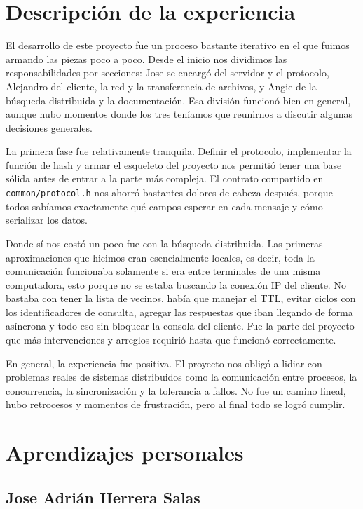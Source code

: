 \documentclass[12pt]{article}
\begin{document}
\newpage
\section{Descripción de la experiencia}

El desarrollo de este proyecto fue un proceso bastante iterativo en el que
fuimos armando las piezas poco a poco. Desde el inicio nos dividimos las
responsabilidades por secciones: Jose se encargó del servidor y el protocolo,
Alejandro del cliente, la red y la transferencia de archivos, y Angie de la
búsqueda distribuida y la documentación. Esa división funcionó bien en general,
aunque hubo momentos donde los tres teníamos que reunirnos a discutir algunas decisiones generales.


La primera fase fue relativamente tranquila. Definir el protocolo, implementar
la función de hash y armar el esqueleto del proyecto nos permitió tener una base
sólida antes de entrar a la parte más compleja. El contrato compartido en
\texttt{common/protocol.h} nos ahorró bastantes dolores de cabeza después,
porque todos sabíamos exactamente qué campos esperar en cada mensaje y cómo
serializar los datos.


Donde sí nos costó un poco fue con la búsqueda distribuida. Las primeras aproximaciones
que hicimos eran esencialmente locales, es decir, toda la comunicación funcionaba solamente si era entre terminales de una misma computadora, esto porque no se estaba buscando la conexión IP del cliente. No bastaba con tener la lista de vecinos, había que manejar el TTL,
evitar ciclos con los identificadores de consulta, agregar las respuestas que
iban llegando de forma asíncrona y todo eso sin bloquear la consola del cliente.
Fue la parte del proyecto que más intervenciones y arreglos requirió hasta que funcionó correctamente.


En general, la experiencia fue positiva. El proyecto nos obligó a lidiar con
problemas reales de sistemas distribuidos como la comunicación entre procesos, la
concurrencia, la sincronización y la tolerancia a fallos. No fue un camino
lineal, hubo retrocesos y momentos de frustración, pero al final todo se logró cumplir.

\newpage
\section{Aprendizajes personales}

\subsection{Jose Adrián Herrera Salas}
\end{document}

